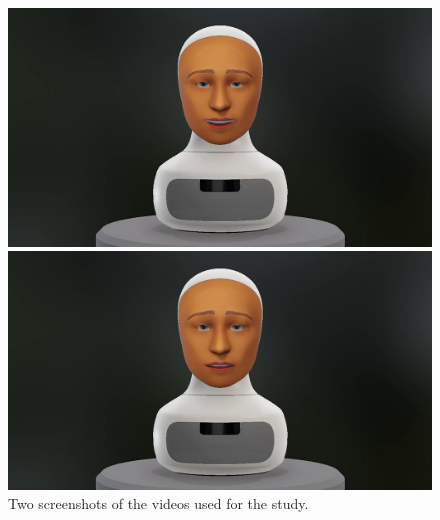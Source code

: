 \documentclass[nomenclature, english, biblatex]{kththesis}
\begin{document}
\begin{figure}
    \centering
    \begin{adjustbox}{max width=\textwidth}
        \begin{adjustbox}{max width=0.5\textwidth}
        \includegraphics{figures/study_screenshot_1.png}
        \end{adjustbox}
        \begin{adjustbox}{max width=0.5\textwidth}
        \includegraphics{figures/study_screenshot_2.png}
        \end{adjustbox}
    \end{adjustbox}
    \caption{Two screenshots of the videos used for the study.}
    \label{fig:study_screenshots}
\end{figure}
\end{document}
